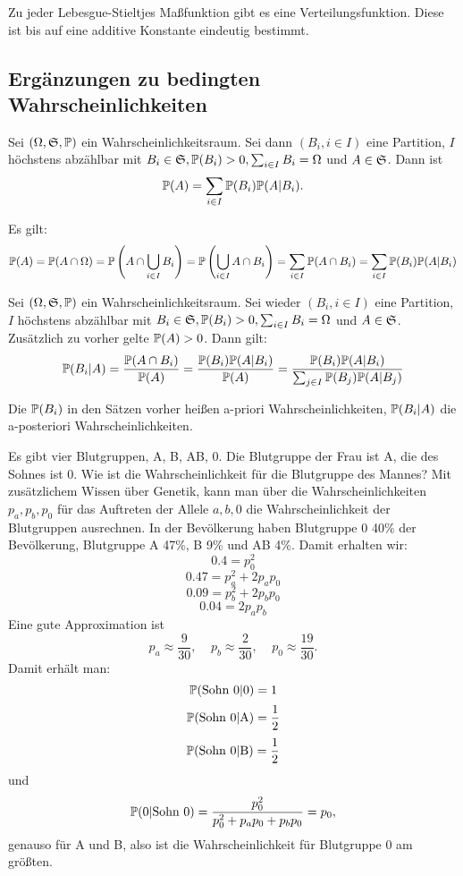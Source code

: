 			\begin{satz}
				Zu jeder Lebesgue-Stieltjes Maßfunktion gibt es eine Verteilungsfunktion. Diese ist bis auf eine additive Konstante eindeutig bestimmt. 
			\end{satz}
			
		\subsection{Ergänzungen zu bedingten Wahrscheinlichkeiten}
			\begin{satz}
				Sei $(\Omega, \mf{S}, \P)$ ein Wahrscheinlichkeitsraum.
				Sei dann $(B_i, i\in I)$ eine Partition, $I$ höchstens abzählbar mit $B_i\in\mf{S}, \P(B_i)>0, \sum_{i\in I}B_i=\Omega$ und $A\in\mf{S}$. Dann ist
				\[ \P(A)=\sum_{i\in I} \P(B_i)\P(A|B_i). \]
			\end{satz}
			
			\begin{bew}
				Es gilt:
				\[ \P(A)=\P(A\cap \Omega)=\P\left( A\cap\bigcup_{i\in I}B_i\right)=\P\left(\bigcup_{i\in I} A\cap B_i\right)=\sum_{i\in I} \P(A\cap B_i)=\sum_{i\in I} \P(B_i)\P(A|B_i) \]
			\end{bew}
			
			\begin{satz}
				Sei $(\Omega, \mf{S}, \P)$ ein Wahrscheinlichkeitsraum.
				Sei wieder $(B_i, i\in I)$ eine Partition, $I$ höchstens abzählbar mit $B_i\in\mf{S}, \P(B_i)>0, \sum_{i\in I}B_i=\Omega$ und $A\in\mf{S}$. Zusätzlich zu vorher gelte $\P(A)>0$. Dann gilt:
				\[ \P(B_i|A)=\frac{\P(A\cap B_i)}{\P(A)}=\frac{\P(B_i)\P(A|B_i)}{\P(A)}=\frac{\P(B_i)\P(A|B_i)}{\sum_{j\in I}\P(B_j)\P(A|B_j)} \]
			\end{satz}
			
			\begin{defi}
				Die $\P(B_i)$ in den Sätzen vorher heißen a-priori Wahrscheinlichkeiten, $\P(B_i|A)$ die a-posteriori Wahrscheinlichkeiten. 
			\end{defi}
			
			\begin{bsp}
				Es gibt vier Blutgruppen, A, B, AB, 0. Die Blutgruppe der Frau ist A, die des Sohnes ist 0. Wie ist die Wahrscheinlichkeit für die Blutgruppe des Mannes?\newline
				Mit zusätzlichem Wissen über Genetik, kann man über die Wahrscheinlichkeiten $p_a,p_b,p_0$ für das Auftreten der Allele $a,b,0$ die Wahrscheinlichkeit der Blutgruppen ausrechnen. In der Bevölkerung haben Blutgruppe 0 40\% der Bevölkerung, Blutgruppe A 47\%, B 9\% und AB 4\%. Damit erhalten wir:
				\[ 0.4=p_0^2 \]
				\[ 0.47=p_a^2+2p_ap_0 \]
				\[ 0.09=p_b^2+2p_bp_0 \]
				\[ 0.04=2p_ap_b \]
				Eine gute Approximation ist
				\[ p_a\approx \frac{9}{30}, \:\:\:\:\:p_b\approx \frac{2}{30}, \:\:\:\:\: p_0\approx\frac{19}{30}. \]
				Damit erhält man:
				\[ \P(\text{Sohn 0|0})=1 \]
				\[ \P(\text{Sohn 0|A})=\frac{1}{2} \]
				\[ \P(\text{Sohn 0|B})=\frac{1}{2} \]
				und 
				\[ \P(\text{0|Sohn 0})=\frac{p_0^2}{p_0^2+p_ap_0+p_bp_0}=p_0, \]
				genauso für A und B, also ist die Wahrscheinlichkeit für Blutgruppe 0 am größten. 
			\end{bsp}
			
